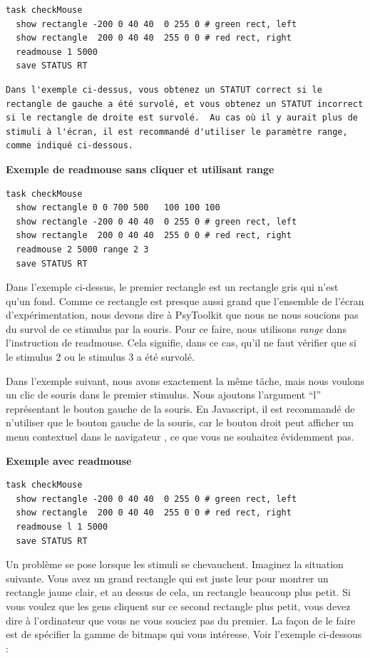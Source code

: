 \documentclass[
]{book}
\begin{document}
\begin{verbatim}
task checkMouse
  show rectangle -200 0 40 40  0 255 0 # green rect, left
  show rectangle  200 0 40 40  255 0 0 # red rect, right
  readmouse 1 5000
  save STATUS RT
\end{verbatim}

\begin{verbatim}
Dans l'exemple ci-dessus, vous obtenez un STATUT correct si le rectangle de gauche a été survolé, et vous obtenez un STATUT incorrect si le rectangle de droite est survolé.  Au cas où il y aurait plus de stimuli à l'écran, il est recommandé d'utiliser le paramètre range, comme indiqué ci-dessous.
\end{verbatim}

\textbf{Exemple de readmouse sans cliquer et utilisant range}

\begin{verbatim}
task checkMouse
  show rectangle 0 0 700 500   100 100 100
  show rectangle -200 0 40 40  0 255 0 # green rect, left
  show rectangle  200 0 40 40  255 0 0 # red rect, right
  readmouse 2 5000 range 2 3
  save STATUS RT
\end{verbatim}

Dans l'exemple ci-dessus, le premier rectangle est un rectangle gris qui
n'est qu'un fond. Comme ce rectangle est presque aussi grand que
l'ensemble de l'écran d'expérimentation, nous devons dire à PsyToolkit
que nous ne nous soucions pas du survol de ce stimulus par la souris.
Pour ce faire, nous utilisons \emph{range} dans l'instruction de
readmouse. Cela signifie, dans ce cas, qu'il ne faut vérifier que si le
stimulus 2 ou le stimulus 3 a été survolé.

Dans l'exemple suivant, nous avons exactement la même tâche, mais nous
voulons un clic de souris dans le premier stimulus. Nous ajoutons
l'argument ``l'' représentant le bouton gauche de la souris. En
Javascript, il est recommandé de n'utiliser que le bouton gauche de la
souris, car le bouton droit peut afficher un menu contextuel dans le
navigateur , ce que vous ne souhaitez évidemment pas.

\textbf{Exemple avec readmouse}

\begin{verbatim}
task checkMouse
  show rectangle -200 0 40 40  0 255 0 # green rect, left
  show rectangle  200 0 40 40  255 0 0 # red rect, right
  readmouse l 1 5000
  save STATUS RT
\end{verbatim}

Un problème se pose lorsque les stimuli se chevauchent. Imaginez la
situation suivante. Vous avez un grand rectangle qui est juste leur pour
montrer un rectangle jaune clair, et au dessus de cela, un rectangle
beaucoup plus petit. Si vous voulez que les gens cliquent sur ce second
rectangle plus petit, vous devez dire à l'ordinateur que vous ne vous
souciez pas du premier. La façon de le faire est de spécifier la gamme
de bitmaps qui vous intéresse. Voir l'exemple ci-dessous :
\end{document}
